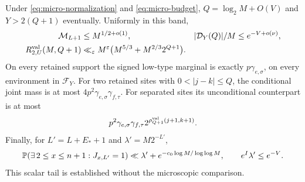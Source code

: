 \begin{lemma}
\label{supp:pivot:lem:inputs}
Under \eqref{eq:micro-normalization} and \eqref{eq:micro-budget},
$Q=\log_2M+O(V)$ and $Y>2(Q+1)$ eventually. Uniformly in this band,
\begin{align}
 \mathcal M_{L+1}&\le M^{1/2+o(1)},&
 |\mathcal D_Y(Q)|/M&\le e^{-V+o(\nu)},
                                  \label{supp:pivot:eq:input-deletion}\\
 R^{\rm val}_{2,U}(M,Q+1)&\ll_\varepsilon
   M^\varepsilon\bigl(M^{5/3}+M^{2/3}2^{Q+1}\bigr).
                                  \label{supp:pivot:eq:input-profile}
\end{align}
On every retained support the signed low-type marginal is exactly
$p\gamma_{e,\sigma}$, on every environment in $\mathcal F_Y$.
For two retained sites with $0<|j-k|\le Q$, the conditional joint mass
is at most $4p^2\gamma_{e,\sigma}\gamma_{f,\tau}$.
For separated sites its unconditional counterpart is at most
\begin{equation}\label{supp:pivot:eq:input-pairs}
 p^2\gamma_{e,\sigma}\gamma_{f,\tau}
                2^{\rho^{\rm val}_{Q+1}(j+1,k+1)}.
\end{equation}
Finally, for $L'=L+E_*+1$ and $\lambda'=M2^{-L'}$,
\begin{equation}\label{supp:pivot:eq:scalar-tail}
 \mathbb P\!\left(\exists\,2\le x\le n+1:J_{x,L'}=1\right)
 \ll\lambda'+e^{-c_0\log M/\log\log M},\qquad
 e^I\lambda'\le e^{-V}.
\end{equation}
This scalar tail is established without the microscopic comparison.
\end{lemma}
